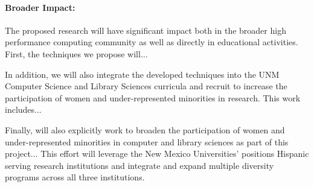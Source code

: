 \paragraph{Broader Impact:} The proposed research will have significant impact
both in the broader high performance computing community as well as directly
in educational activities. First, the techniques we propose will...

In addition, we will also integrate the developed techniques into the UNM
Computer Science and Library Sciences curricula and recruit to increase the 
participation of women and under-represented minorities in research. This work includes...

Finally, will also explicitly work to broaden the participation of women and under-represented
minorities in computer and library sciences as part of this project... This effort  will
leverage the New Mexico Universities' positions Hispanic serving research institutions and integrate and expand multiple diversity programs across all three institutions.

